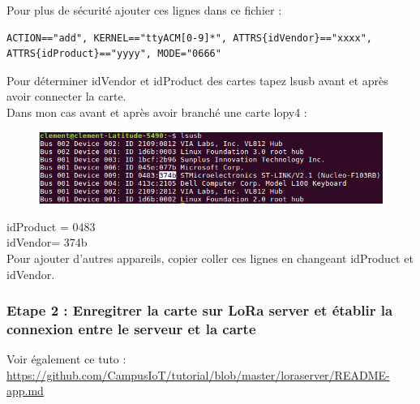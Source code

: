 \documentclass{article}
\begin{document}
\begin{itemize}
\begin{enumerate}
Pour plus de sécurité ajouter ces lignes dans ce fichier :

\begin{verbatim}
ACTION=="add", KERNEL=="ttyACM[0-9]*", ATTRS{idVendor}=="xxxx", 
ATTRS{idProduct}=="yyyy", MODE="0666"
\end{verbatim}
 
 Pour déterminer idVendor et idProduct des cartes tapez lsusb avant et après avoir connecter la carte. \\

 Dans mon cas avant et après avoir branché une carte lopy4 :
 
 \begin{figure}[H]
\begin{center}
\advance\leftskip-3cm
\advance\rightskip-3cm
\includegraphics[keepaspectratio=true,scale=0.5]{lsusb.png}
\label{visina8}
\end{center}\end{figure}

idProduct = 0483  \\
idVendor= 374b \\

Pour ajouter d'autres appareils, copier coller ces lignes en changeant idProduct et idVendor. \\





\end{enumerate}



\subsubsection{Etape 2 : Enregitrer la carte sur LoRa server et établir la connexion entre le serveur et la carte}

Voir également ce tuto : 
\url{https://github.com/CampusIoT/tutorial/blob/master/loraserver/README-app.md} \\


\end{itemize}
\end{document}
